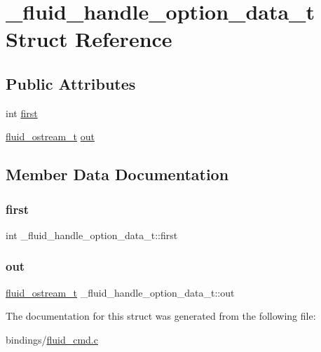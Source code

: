 \hypertarget{struct__fluid__handle__option__data__t}{}\section{\+\_\+fluid\+\_\+handle\+\_\+option\+\_\+data\+\_\+t Struct Reference}
\label{struct__fluid__handle__option__data__t}
\subsection*{Public Attributes}
\begin{DoxyCompactItemize}
\item 
int \hyperlink{struct__fluid__handle__option__data__t_a127111d706fc1ca6957a7bf40602e831}{first}
\item 
\hyperlink{types_8h_a6d8c441b84ab0430e358438cee876c69}{fluid\+\_\+ostream\+\_\+t} \hyperlink{struct__fluid__handle__option__data__t_a91c8c4c3e0a7172e6ea8f388a842fbe9}{out}
\end{DoxyCompactItemize}


\subsection{Member Data Documentation}
\mbox{\label{struct__fluid__handle__option__data__t_a127111d706fc1ca6957a7bf40602e831}} 
\subsubsection{\texorpdfstring{first}{first}}
{\footnotesize\ttfamily int \+\_\+fluid\+\_\+handle\+\_\+option\+\_\+data\+\_\+t\+::first}

\mbox{\label{struct__fluid__handle__option__data__t_a91c8c4c3e0a7172e6ea8f388a842fbe9}} 
\subsubsection{\texorpdfstring{out}{out}}
{\footnotesize\ttfamily \hyperlink{types_8h_a6d8c441b84ab0430e358438cee876c69}{fluid\+\_\+ostream\+\_\+t} \+\_\+fluid\+\_\+handle\+\_\+option\+\_\+data\+\_\+t\+::out}



The documentation for this struct was generated from the following file\+:\begin{DoxyCompactItemize}
\item 
bindings/\hyperlink{fluid__cmd_8c}{fluid\+\_\+cmd.\+c}\end{DoxyCompactItemize}
